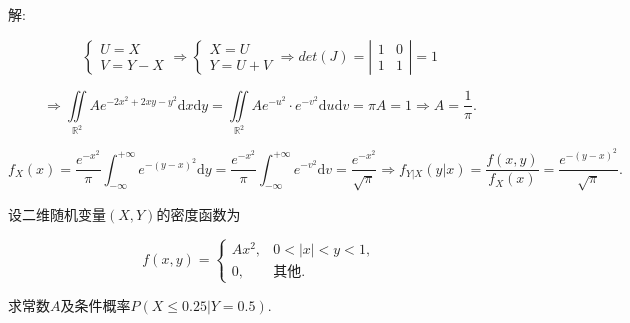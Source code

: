 \documentclass[standard]{ExBook}
\begin{document}
\begin{qitems}
\vspace{-5em}

    \begin{bbox}
解: 
\vspace{-2em}
\begin{center}
\begin{equation}
    \left\{
    \begin{array}{l}
        \nonumber
        U=X\\
        V=Y-X
    \end{array}
    \right.
    \Longrightarrow
    \left\{
    \begin{array}{l}
        \nonumber
        X=U\\
        Y=U+V
    \end{array}
    \right.
    \Longrightarrow
    det(J)=
    \left|
    \begin{array}{cc}
        1 & 0\\
        1 & 1
    \end{array}
    \right|
    =1
\end{equation}
\end{center}
\begin{center}
\begin{equation}
    \nonumber
    \Longrightarrow
    \displaystyle\iint\limits_{\mathbb{R}^2}A e^{-2x^2+2xy-y^2}\mathrm{d}x\mathrm{d}y=\iint\limits_{\mathbb{R}^2}A e^{-u^2}\cdot e^{-v^2}\mathrm{d}u\mathrm{d}v=\pi A=1
    \Longrightarrow
    A=\frac{1}{\pi}.
\end{equation}
\end{center}
$$f_{X}(x)=\displaystyle\frac{e^{-x^2}}{\pi}\int_{-\infty}^{+\infty}e^{-(y-x)^2}\mathrm{d}y=\frac{e^{-x^2}}{\pi}\int_{-\infty}^{+\infty}e^{-v^2}\mathrm{d}v=\frac{e^{-x^2}}{\sqrt{\pi}} \Longrightarrow f_{Y|X}(y|x)=\frac{f(x,y)}{f_{X}(x)}=\frac{e^{-(y-x)^2}}{\sqrt{\pi}}.$$
    \end{bbox}

\vspace{-5em}

    \begin{bbox}
    \begin{shaded}
        \qitem
设二维随机变量$(X,Y)$的密度函数为
\vspace{-2em}
\begin{center}
\begin{equation}
    f(x,y)=
    \left\{
    \begin{array}{cl}
        \nonumber
        A x^2, &0 < |x| < y < 1,\\
        0, &\text{其他}.
    \end{array}
    \right.
\end{equation}
\end{center}
求常数$A$及条件概率$P(X\leq0.25|Y=0.5)$.
    \end{shaded}
    \end{bbox}


\end{qitems}
\end{document}
